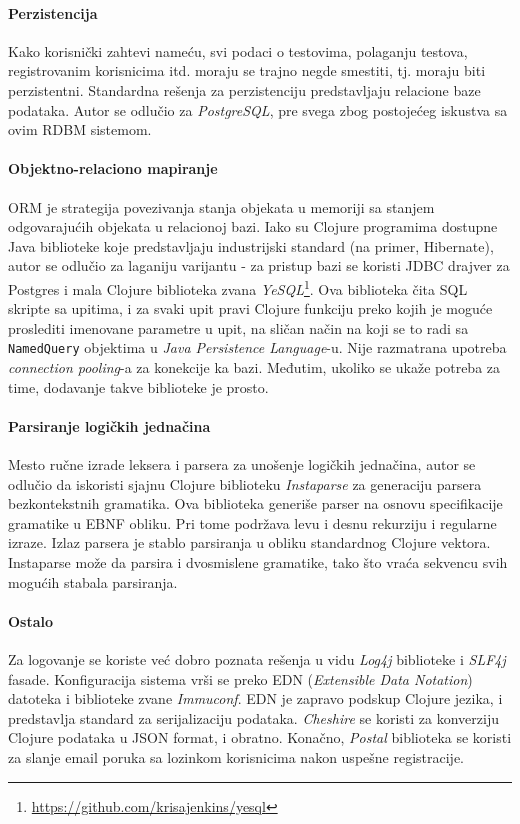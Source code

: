 \paragraph{Perzistencija}
Kako korisnički zahtevi nameću, svi podaci o testovima, polaganju testova, registrovanim korisnicima itd. moraju se trajno negde smestiti, tj. moraju biti perzistentni. Standardna rešenja za perzistenciju predstavljaju relacione baze podataka. Autor se odlučio za \emph{PostgreSQL}\cite{postgres}, pre svega zbog postojećeg iskustva sa ovim RDBM sistemom.

\paragraph{Objektno-relaciono mapiranje}
ORM je strategija povezivanja stanja objekata u memoriji sa stanjem odgovarajućih objekata u relacionoj bazi. Iako su Clojure programima dostupne Java biblioteke koje predstavljaju industrijski standard (na primer, Hibernate), autor se odlučio za laganiju varijantu - za pristup bazi se koristi JDBC drajver za Postgres i mala Clojure biblioteka zvana \emph{YeSQL}\footnote{\url{https://github.com/krisajenkins/yesql}}. Ova biblioteka čita SQL skripte sa upitima, i za svaki upit pravi Clojure funkciju preko kojih je moguće proslediti imenovane parametre u upit, na sličan način na koji se to radi sa \texttt{NamedQuery} objektima u \textit{Java Persistence Language}-u. Nije razmatrana upotreba \textit{connection pooling}-a za konekcije ka bazi. Međutim, ukoliko se ukaže potreba za time, dodavanje takve biblioteke je prosto.

\paragraph{Parsiranje logičkih jednačina} Mesto ručne izrade leksera i parsera za unošenje logičkih jednačina, autor se odlučio da iskoristi sjajnu Clojure biblioteku \emph{Instaparse}\cite{instaparse} za generaciju parsera bezkontekstnih gramatika. Ova biblioteka generiše parser na osnovu specifikacije gramatike u EBNF obliku. Pri tome podržava levu i desnu rekurziju i regularne izraze. Izlaz parsera je stablo parsiranja u obliku standardnog Clojure vektora. Instaparse može da parsira i dvosmislene gramatike, tako što vraća sekvencu svih mogućih stabala parsiranja.

\paragraph{Ostalo} Za logovanje se koriste već dobro poznata rešenja u vidu \emph{Log4j} biblioteke i \emph{SLF4j} fasade. Konfiguracija sistema vrši se preko EDN (\textit{Extensible Data Notation}) datoteka i biblioteke zvane \emph{Immuconf}. EDN je zapravo podskup Clojure jezika, i predstavlja standard za serijalizaciju podataka. \textit{Cheshire} se koristi za konverziju Clojure podataka u JSON format, i obratno. Konačno, \textit{Postal} biblioteka se koristi za slanje email poruka sa lozinkom korisnicima nakon uspešne registracije.

